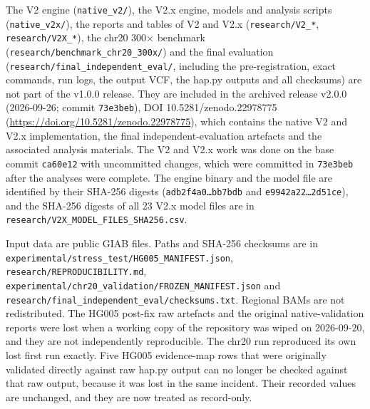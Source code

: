 \documentclass[11pt,a4paper]{article}
\begin{document}
The V2 engine (\texttt{native\_\allowbreak{}v2/\allowbreak{}}), the V2.x engine, models and analysis scripts (\texttt{native\_\allowbreak{}v2x/\allowbreak{}}), the reports and tables of V2 and V2.x (\texttt{research/\allowbreak{}V2\_\allowbreak{}*}, \texttt{research/\allowbreak{}V2X\_\allowbreak{}*}), the chr20 300$\times$ benchmark (\texttt{research/\allowbreak{}benchmark\_\allowbreak{}chr20\_\allowbreak{}300x/\allowbreak{}}) and the final evaluation (\texttt{research/\allowbreak{}final\_\allowbreak{}independent\_\allowbreak{}eval/\allowbreak{}}, including the pre-registration, exact commands, run logs, the output VCF, the hap.py outputs and all checksums) are not part of the v1.0.0 release. They are included in the archived release v2.0.0 (2026-09-26; commit \texttt{73e3beb}), DOI 10.5281/zenodo.22978775 (\url{https://doi.org/10.5281/zenodo.22978775}), which contains the native V2 and V2.x implementation, the final independent-evaluation artefacts and the associated analysis materials. The V2 and V2.x work was done on the base commit \texttt{ca60e12} with uncommitted changes, which were committed in \texttt{73e3beb} after the analyses were complete. The engine binary and the model file are identified by their SHA-256 digests (\texttt{adb2f4a0\ldots{}bb7bdb} and \texttt{e9942a22\ldots{}2d51ce}), and the SHA-256 digests of all 23 V2.x model files are in \texttt{research/\allowbreak{}V2X\_\allowbreak{}MODEL\_\allowbreak{}FILES\_\allowbreak{}SHA256.\allowbreak{}csv}.

Input data are public GIAB files. Paths and SHA-256 checksums are in \texttt{experimental/\allowbreak{}stress\_\allowbreak{}test/\allowbreak{}HG005\_\allowbreak{}MANIFEST.\allowbreak{}json}, \texttt{research/\allowbreak{}REPRODUCIBILITY.\allowbreak{}md}, \texttt{experimental/\allowbreak{}chr20\_\allowbreak{}validation/\allowbreak{}FROZEN\_\allowbreak{}MANIFEST.\allowbreak{}json} and \texttt{research/\allowbreak{}final\_\allowbreak{}independent\_\allowbreak{}eval/\allowbreak{}checksums.\allowbreak{}txt}. Regional BAMs are not redistributed. The HG005 post-fix raw artefacts and the original native-validation reports were lost when a working copy of the repository was wiped on 2026-09-20, and they are not independently reproducible. The chr20 run reproduced its own lost first run exactly. Five HG005 evidence-map rows that were originally validated directly against raw hap.py output can no longer be checked against that raw output, because it was lost in the same incident. Their recorded values are unchanged, and they are now treated as record-only.
\end{document}
